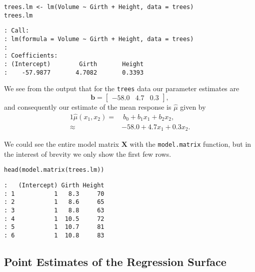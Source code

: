 \begin{verbatim}
trees.lm <- lm(Volume ~ Girth + Height, data = trees)
trees.lm
\end{verbatim}

\begin{verbatim}
: Call:
: lm(formula = Volume ~ Girth + Height, data = trees)
: 
: Coefficients:
: (Intercept)        Girth       Height  
:    -57.9877       4.7082       0.3393
\end{verbatim}

We see from the output that for the \texttt{trees} data our parameter
estimates are \[ \mathbf{b}=\begin{bmatrix}-58.0 & 4.7 &
0.3\end{bmatrix}, \] and consequently our estimate of the mean
response is \(\hat{\mu}\) given by
\begin{alignat}{1} 
\hat{\mu}(x_{1},x_{2}) = & \ b_{0} + b_{1} x_{1} + b_{2}x_{2},\\ \approx & -58.0 + 4.7 x_{1} + 0.3 x_{2}.
\end{alignat} 

We could see the entire model matrix \(\mathbf{X}\) with the
\texttt{model.matrix} 
function, but in the interest of brevity we only show the first few
rows.

\begin{verbatim}
head(model.matrix(trees.lm))
\end{verbatim}

\begin{verbatim}
:   (Intercept) Girth Height
: 1           1   8.3     70
: 2           1   8.6     65
: 3           1   8.8     63
: 4           1  10.5     72
: 5           1  10.7     81
: 6           1  10.8     83
\end{verbatim}

\subsection{Point Estimates of the Regression Surface}
\label{sec-12-2-2}

